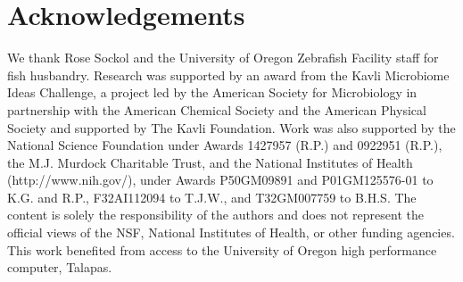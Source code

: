\section*{Acknowledgements}
We thank Rose Sockol and the University of Oregon Zebrafish Facility staff for fish husbandry. Research was supported by an award from the Kavli Microbiome Ideas Challenge, a project led by the American Society for Microbiology in partnership with the American Chemical Society and the American Physical Society and supported by The Kavli Foundation. Work was also supported by the National Science Foundation under Awards 1427957 (R.P.) and 0922951 (R.P.), the M.J. Murdock Charitable Trust, and the National Institutes of Health (http://www.nih.gov/), under Awards P50GM09891 and P01GM125576-01 to K.G. and R.P., F32AI112094 to T.J.W., and T32GM007759 to B.H.S. The content is solely the responsibility of the authors and does not represent the official views of the NSF, National Institutes of Health, or other funding agencies. This work benefited from access to the University of Oregon high performance computer, Talapas.




